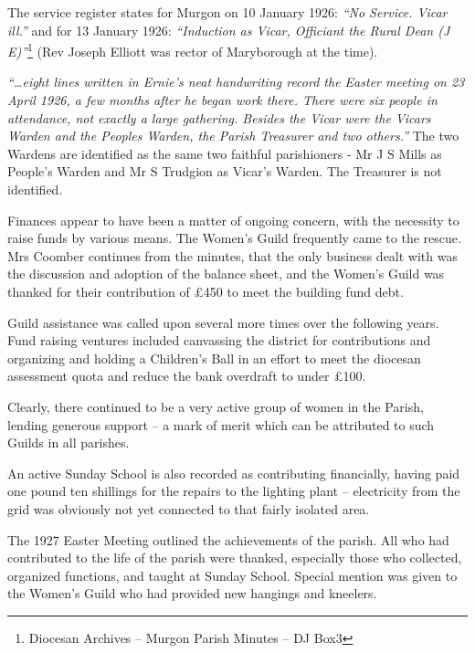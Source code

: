 The service register states for Murgon on 10 January 1926: \emph{``No Service. Vicar ill.''} and for 13 January 1926: \emph{``Induction as Vicar, Officiant the Rural Dean (J E)''}\footnote{Diocesan Archives -- Murgon Parish Minutes -- DJ Box3} (Rev Joseph Elliott was rector of Maryborough at the time).


\emph{``\ldots eight lines written in Ernie's neat handwriting record the Easter meeting on 23 April 1926, a few months after he began work there. There were six people in attendance, not exactly a large gathering. Besides the Vicar were the Vicars Warden and the Peoples Warden, the Parish Treasurer and two others.''} The two Wardens are identified as the same two faithful parishioners - Mr J S Mills as People's Warden and Mr S Trudgion as Vicar's Warden. The Treasurer is not identified.



Finances appear to have been a matter of ongoing concern, with the necessity to raise funds by various means. The Women's Guild frequently came to the rescue\emph{.} Mrs Coomber continues from the minutes, that the only business dealt with was the discussion and adoption of the balance sheet, and the Women's Guild was thanked for their contribution of \pounds450 to meet the building fund debt.



Guild assistance was called upon several more times over the following years. Fund raising ventures included canvassing the district for contributions and organizing and holding a Children's Ball in an effort to meet the diocesan assessment quota and reduce the bank overdraft to under \pounds100.



Clearly, there continued to be a very active group of women in the Parish, lending generous support -- a mark of merit which can be attributed to such Guilds in all parishes.



An active Sunday School is also recorded as contributing financially, having paid one pound ten shillings for the repairs to the lighting plant -- electricity from the grid was obviously not yet connected to that fairly isolated area.



The 1927 Easter Meeting outlined the achievements of the parish. All who had contributed to the life of the parish were thanked, especially those who collected, organized functions, and taught at Sunday School. Special mention was given to the Women's Guild who had provided new hangings and kneelers.



